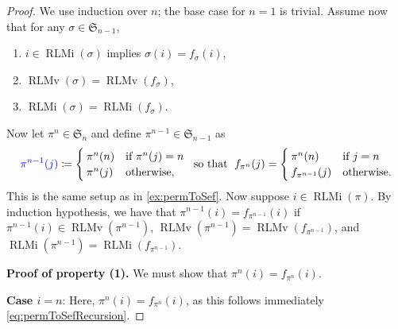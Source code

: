 \documentclass[reqno]{amsart}
\theoremstyle{definition}
\newcommand{\defin}[1]{%
\relax\ifmmode%
\textcolor{blue}{#1}%
\else\textcolor{blue}{\emph{#1}}%
\fi%
}
\newcommand{\symS}{\mathfrak{S}}
\DeclareMathOperator{\RLMv}{RLMv}
\DeclareMathOperator{\RLMi}{RLMi}
\begin{document}
\begin{proof}
We use induction over $n$; the base case for $n=1$ is trivial.
Assume now that for any $\sigma \in \symS_{n-1}$, 
\begin{enumerate}[label=(\roman*)]
    \item $i\in \RLMi(\sigma)$ implies $\sigma(i)=f_{\sigma}(i)$,
    \item $\RLMv(\sigma) = \RLMv(f_{\sigma})$,
    \item $\RLMi(\sigma) = \RLMi(f_{\sigma})$.
\end{enumerate}
%
Now let $\pi^n \in\symS_n$ and define $\pi^{n-1} \in \symS_{n-1}$  as
\begin{align}\label{eq:someLemmaRec}
    \defin{\pi^{n-1}(j)} \coloneqq \begin{cases}
             \pi^{n}(n) &\text{if }\pi^n(j)=n\\
             \pi^{n}(j) &\text{otherwise},
			\end{cases}
\; \text{ so that } \; 
f_{\pi^n}(j)=\begin{cases}
             \pi^n(n) &\text{if }j=n\\
             f_{\pi^{n-1}}(j) &\text{otherwise.}
             \end{cases}
\end{align}
This is the same setup as in \cref{ex:permToSef}.
Now suppose $i \in \RLMi(\pi)$. 
By induction hypothesis, we have that 
$\pi^{n-1}(i) = f_{\pi^{n-1}}(i)$ if 
$\pi^{n-1}(i) \in \RLMv(\pi^{n-1})$, $\RLMv(\pi^{n-1})=\RLMv(f_{\pi^{n-1}})$,
and $\RLMi(\pi^{n-1}) =  \RLMi(f_{\pi^{n-1}})$.


\medskip 
\noindent
\textbf{Proof of property (1).}
We must show that $\pi^n(i)=f_{\pi^n}(i)$.

\noindent
\textbf{Case $i=n$}:
 Here, $\pi^n(i) = f_{\pi^n}(i)$, as this follows immediately \eqref{eq:permToSefRecursion}.


\end{proof}
\end{document}
